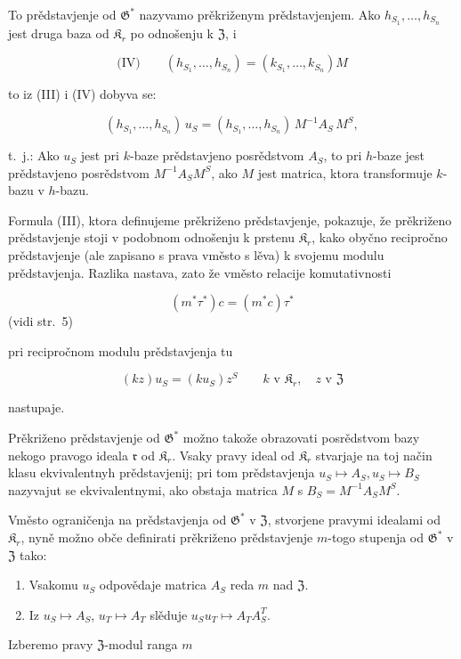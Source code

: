 \documentclass[11pt]{article}
\begin{document}
To prědstavjenje od \(\mathfrak{G}^*\) nazyvamo prěkriženym prědstavjenjem. Ako \(h_{S_1}, \ldots, h_{S_n}\) jest druga baza od \(\mathfrak{K}_r\) po odnošenju k \(\mathfrak{Z}\), i

\[
\text{(IV)}\qquad (h_{S_1}, \ldots, h_{S_n}) = (k_{S_1}, \ldots, k_{S_n})M
\]

to iz (III) i (IV) dobyva se:

\[(h_{S_1},\ldots,h_{S_n})\,u_S=(h_{S_1},\ldots,h_{S_n})\,M^{-1}A_S\,M^S,\]

t.~j.: Ako \(u_S\) jest pri \(k\)-baze prědstavjeno posrědstvom \(A_S\), to pri \(h\)-baze jest prědstavjeno posrědstvom \(M^{-1}A_SM^S\), ako \(M\) jest matrica, ktora transformuje \(k\)-bazu v \(h\)-bazu.

Formula (III), ktora definujeme prěkriženo prědstavjenje, pokazuje, že prěkriženo prědstavjenje stoji v podobnom odnošenju k prstenu \(\mathfrak K_r\), kako obyčno recipročno prědstavjenje (ale zapisano s prava vměsto s lěva) k svojemu modulu prědstavjenja. Razlika nastava, zato že vměsto relacije komutativnosti

\[(m^*\tau^*)c = (m^*c)\tau^*\]
(vidi str.~5)

pri recipročnom modulu prědstavjenja tu

\[
(kz)u_S=(ku_S)z^S\qquad k\text{ v }\mathfrak K_r,\quad z\text{ v }\mathfrak Z
\]

nastupaje.

Prěkriženo prědstavjenje od \(\mathfrak{G}^*\) možno takože obrazovati posrědstvom bazy nekogo pravogo ideala \(\mathfrak r\) od \(\mathfrak{K}_r\). Vsaky pravy ideal od \(\mathfrak{K}_r\) stvarjaje na toj način klasu ekvivalentnyh prědstavjenij; pri tom prědstavjenja \(u_S \mapsto A_S, u_S \mapsto B_S\) nazyvajut se ekvivalentnymi, ako obstaja matrica \(M\) s \(B_S = M^{-1}A_SM^S\).

Vměsto ograničenja na prědstavjenja od \(\mathfrak G^*\) v \(\mathfrak Z\), stvorjene pravymi idealami od \(\mathfrak K_r\), nyně možno obče definirati prěkriženo prědstavjenje \(m\)-togo stupenja od \(\mathfrak G^*\) v \(\mathfrak Z\) tako:

\begin{enumerate}
\item Vsakomu \(u_S\) odpovědaje matrica \(A_S\) reda \(m\) nad \(\mathfrak Z\).
\item Iz \(u_S \mapsto A_S\), \(u_T \mapsto A_T\) slěduje \(u_Su_T \mapsto A_TA_S^T\).
\end{enumerate}

Izberemo pravy \(\mathfrak Z\)-modul ranga \(m\)
\end{document}
